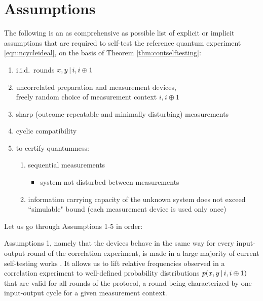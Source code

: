 \section{Assumptions}
\label{sec:kscontass}
The following is an as comprehensive as possible list of explicit or implicit assumptions that are required to self-test the reference quantum experiment \ref{eqn:ncycleideal}, on the basis of Theorem \ref{thm:contselftesting}:
\begin{enumerate}
    \item i.i.d.\ rounds $x,y \thinspace\vert\thinspace i,i\oplus 1$
    \item uncorrelated preparation and measurement devices,\\ freely random choice of measurement context $i,i\oplus 1$
    \item sharp (outcome-repeatable and minimally disturbing) measurements 
    \item cyclic compatibility
    \item to certify quantumness:
    \begin{enumerate}
    \item sequential measurements
    \begin{itemize}
        \item system not disturbed between measurements
    \end{itemize}
    \item information carrying capacity of the unknown system does not exceed ``simulable" bound (each measurement device is used only once)
    
     \end{enumerate}
\end{enumerate}

Let us go through Assumptions 1-5 in order:

Assumptions 1, namely that the devices behave in the same way for every input-output round of the correlation experiment, is made in a large majority of current self-testing works \cite{Supic2020}. It allows us to lift relative frequencies observed in a correlation experiment to well-defined probability distributions $p(x,y\thinspace\vert\thinspace i, i\oplus 1)$ that are valid for all rounds of the protocol, a round being characterized by one input-output cycle for a given measurement context.

